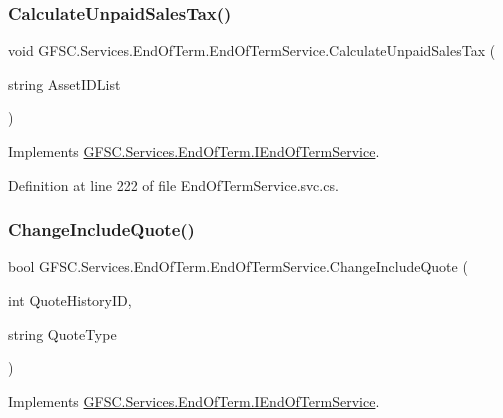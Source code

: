 \subsubsection{\texorpdfstring{Calculate\+Unpaid\+Sales\+Tax()}{CalculateUnpaidSalesTax()}}
{\footnotesize\ttfamily void G\+F\+S\+C.\+Services.\+End\+Of\+Term.\+End\+Of\+Term\+Service.\+Calculate\+Unpaid\+Sales\+Tax (\begin{DoxyParamCaption}\item[{string}]{Asset\+I\+D\+List }\end{DoxyParamCaption})}



Implements \mbox{\hyperlink{interface_g_f_s_c_1_1_services_1_1_end_of_term_1_1_i_end_of_term_service_a06c356526a52c46532fbe269341ba77f}{G\+F\+S\+C.\+Services.\+End\+Of\+Term.\+I\+End\+Of\+Term\+Service}}.



Definition at line 222 of file End\+Of\+Term\+Service.\+svc.\+cs.

\mbox{\label{class_g_f_s_c_1_1_services_1_1_end_of_term_1_1_end_of_term_service_a8347b6e637bf8a074ca4a45cc602610b}} 
\subsubsection{\texorpdfstring{Change\+Include\+Quote()}{ChangeIncludeQuote()}}
{\footnotesize\ttfamily bool G\+F\+S\+C.\+Services.\+End\+Of\+Term.\+End\+Of\+Term\+Service.\+Change\+Include\+Quote (\begin{DoxyParamCaption}\item[{int}]{Quote\+History\+ID,  }\item[{string}]{Quote\+Type }\end{DoxyParamCaption})}



Implements \mbox{\hyperlink{interface_g_f_s_c_1_1_services_1_1_end_of_term_1_1_i_end_of_term_service_a2eac908a57f89e40f6ebab356ee6f665}{G\+F\+S\+C.\+Services.\+End\+Of\+Term.\+I\+End\+Of\+Term\+Service}}.



